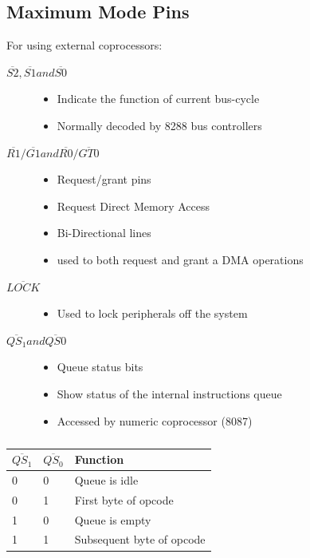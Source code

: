 \documentclass{article}
\begin{document}
\subsection{Maximum Mode Pins}
For using external coprocessors:
\begin{description}

    \item[$\overline{S2} , \overline{S1} and \overline{S0} $]
    \begin{itemize}
        \item Indicate the function of current bus-cycle
        \item Normally decoded by 8288 bus controllers
    \end{itemize}

    \item[$\overline{R1} / \overline{G1} and \overline{R0} / \overline{GT0} $]
    \begin{itemize}
        \item Request/grant pins
        \item Request Direct Memory Access
        \item Bi-Directional lines
        \item used to both request and grant a DMA operations
    \end{itemize}

    \item[$\overline{LOCK} $]
    \begin{itemize}
        \item Used to lock peripherals off the system
    \end{itemize}

    \item[$\overline{QS_1}  and \overline{QS0} $]
    \begin{itemize}
        \item Queue status bits
        \item Show status of the internal instructions queue
        \item Accessed by numeric coprocessor (8087)
    \end{itemize}

\end{description}

\begin{table}[h!]
\centering
\begin{tabular}{ |p{1cm}|p{1cm}|p{3cm}|  }
\hline
$ \overline{QS_1} $ & $ \overline{QS_0} $  & Function   \\
\hline
0 & 0 & Queue is idle \\
0 & 1 & First byte of opcode \\
1 & 0 & Queue is empty\\
1 & 1 & Subsequent byte of opcode \\
\hline
\end{tabular}

\caption{}
\label{table:4}
\end{table}
\end{document}
